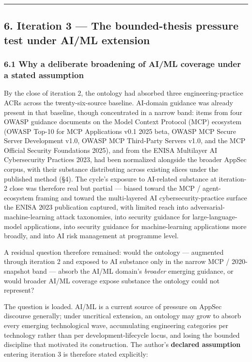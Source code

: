 \documentclass[
]{article}
\begin{document}
\begin{center}\rule{0.5\linewidth}{0.5pt}\end{center}

\subsection{6. Iteration 3 --- The bounded-thesis pressure test under
AI/ML
extension}\label{iteration-3-the-bounded-thesis-pressure-test-under-aiml-extension}

\subsubsection{6.1 Why a deliberate broadening of AI/ML coverage under a
stated
assumption}\label{why-a-deliberate-broadening-of-aiml-coverage-under-a-stated-assumption}

By the close of iteration 2, the ontology had absorbed three
engineering-practice ACRs across the twenty-six-source baseline.
AI-domain guidance was already present in that baseline, though
concentrated in a narrow band: items from four OWASP guidance documents
on the Model Context Protocol (MCP) ecosystem (OWASP Top-10 for MCP
Applications v0.1 2025 beta, OWASP MCP Secure Server Development v1.0,
OWASP MCP Third-Party Servers v1.0, and the MCP Official Security
Foundations 2025), and from the ENISA Multilayer AI Cybersecurity
Practices 2023, had been normalized alongside the broader AppSec corpus,
with their substance distributing across existing slices under the
published method (§4). The cycle's exposure to AI-related substance at
iteration-2 close was therefore real but partial --- biased toward the
MCP / agent-ecosystem framing and toward the multi-layered AI
cybersecurity-practice surface the ENISA 2023 publication captured, with
limited reach into adversarial-machine-learning attack taxonomies, into
security guidance for large-language-model applications, into security
guidance for machine-learning applications more broadly, and into AI
risk management at programme level.

A residual question therefore remained: would the ontology --- augmented
through iteration 2 and exposed to AI substance only in the narrow MCP /
2020-snapshot band --- absorb the AI/ML domain's \emph{broader} emerging
guidance, or would broader AI/ML coverage expose substance the ontology
could not represent?

The question is loaded. AI/ML is a current source of pressure on AppSec
discourse generally; under uncritical extension, an ontology may grow to
absorb every emerging technological wave, accumulating engineering
categories per technology rather than per development-lifecycle locus,
and losing the bounded discipline that motivated its construction. The
author's \textbf{declared assumption} entering iteration 3 is therefore
stated explicitly:
\end{document}
